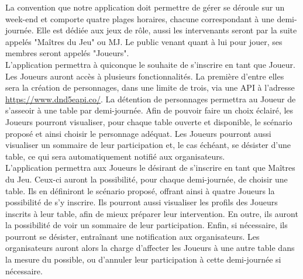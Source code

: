 \documentclass[11pt]{article}
\begin{document}
La convention que notre application doit permettre de gérer se déroule sur un week-end et comporte quatre plages horaires, chacune correspondant à une demi-journée. Elle est dédiée aux jeux de rôle, aussi les intervenants seront par la suite appelés "Maîtres du Jeu" ou MJ. Le public venant quant à lui pour jouer, ses membres seront appelés "Joueurs".\\ 

L'application permettra à quiconque le souhaite de s'inscrire en tant que Joueur. Les Joueurs auront accès à plusieurs fonctionnalités. La première d'entre elles sera la création de personnages, dans une limite de trois, via une API à l'adresse \textcolor{blue}{\href{https://www.dnd5eapi.co/}{https://www.dnd5eapi.co/}}. La détention de personnages permettra au Joueur de s'asseoir à une table par demi-journée. Afin de pouvoir faire un choix éclairé, les Joueurs pourront visualiser, pour chaque table ouverte et disponible, le scénario proposé et ainsi choisir le personnage adéquat. Les Joueurs pourront aussi visualiser un sommaire de leur participation et, le cas échéant, se désister d'une table, ce qui sera automatiquement notifié aux organisateurs.\\

L'application permettra aux Joueurs le désirant de s'inscrire en tant que Maîtres du Jeu. Ceux-ci auront la possibilité, pour chaque demi-journée, de choisir une table.  Ils en définiront le scénario proposé, offrant ainsi à quatre Joueurs la possibilité de s'y inscrire. Ils pourront aussi visualiser les profils des Joueurs inscrits à leur table, afin de mieux préparer leur intervention. En outre, ils auront la possibilité de voir un sommaire de leur participation. Enfin, si nécessaire, ils pourront se désister, entraînant une notification aux organisateurs. Les organisateurs auront alors la charge d'affecter les Joueurs à une autre table dans la mesure du possible, ou d'annuler leur participation à cette demi-journée si nécessaire.\\
\end{document}
